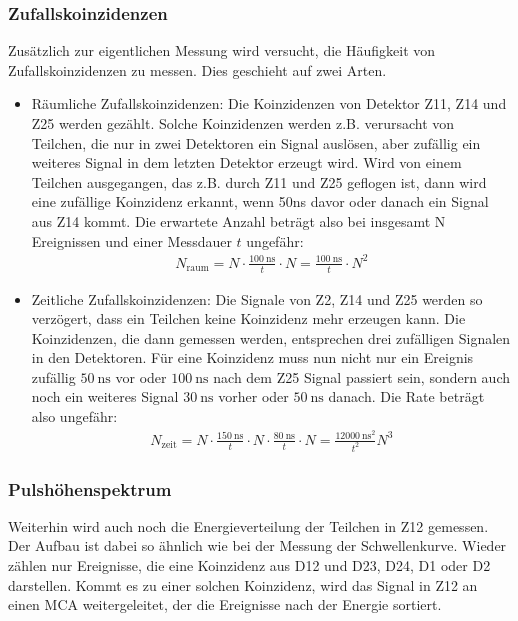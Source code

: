 \subsubsection{Zufallskoinzidenzen}
Zusätzlich zur eigentlichen Messung wird versucht, die Häufigkeit von Zufallskoinzidenzen zu messen. Dies geschieht auf zwei Arten.
\begin{itemize}
	\item Räumliche Zufallskoinzidenzen: Die Koinzidenzen von Detektor Z11, Z14 und Z25 werden gezählt. Solche Koinzidenzen werden z.B. verursacht von Teilchen, die nur in zwei Detektoren ein Signal auslösen, aber zufällig ein weiteres Signal in dem letzten Detektor erzeugt wird. Wird von einem Teilchen ausgegangen, das z.B. durch Z11 und Z25 geflogen ist, dann wird eine zufällige Koinzidenz erkannt, wenn 50ns davor oder danach ein Signal aus Z14 kommt. Die erwartete Anzahl beträgt also bei insgesamt N Ereignissen und einer Messdauer $t$ ungefähr: 
\begin{align}
N_{\text{raum}} = N \cdot \frac{\SI{100}{\nano\second}}{t} \cdot N = \frac{\SI{100}{\nano\second}}{t} \cdot N^2 
\label{equ:random_space}
\end{align}

	\item Zeitliche Zufallskoinzidenzen: Die Signale von Z2, Z14 und Z25 werden so verzögert, dass ein Teilchen keine Koinzidenz mehr erzeugen kann. Die Koinzidenzen, die dann gemessen werden, entsprechen drei zufälligen Signalen in den Detektoren. Für eine Koinzidenz muss nun nicht nur ein Ereignis zufällig $\SI{50}{\nano \second}$ vor oder $\SI{100}{\nano \second}$ nach dem Z25 Signal passiert sein, sondern auch noch ein weiteres Signal $\SI{30}{\nano \second}$ vorher oder $\SI{50}{\nano \second}$ danach. Die Rate beträgt also ungefähr:
	\begin{align}
N_{\text{zeit}} = N \cdot \frac{\SI{150}{\nano\second}}{t} \cdot N \cdot \frac{\SI{80}{\nano\second}}{t} \cdot N = \frac{\SI{12000}{\nano\second}^2}{t^2}N^3
\label{equ:random_time}
\end{align}

\end{itemize}

\subsubsection{Pulshöhenspektrum}
Weiterhin wird auch noch die Energieverteilung der Teilchen in Z12 gemessen. Der Aufbau ist dabei so ähnlich wie bei der Messung der Schwellenkurve. Wieder zählen nur Ereignisse, die eine Koinzidenz aus D12 und D23, D24, D1 oder D2 darstellen. Kommt es zu einer solchen Koinzidenz, wird das Signal in Z12 an einen MCA weitergeleitet, der die Ereignisse nach der Energie sortiert.
